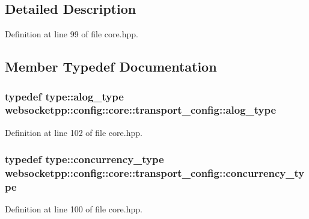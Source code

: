 \subsection{Detailed Description}


Definition at line 99 of file core.\+hpp.



\subsection{Member Typedef Documentation}
\hypertarget{structwebsocketpp_1_1config_1_1core_1_1transport__config_aba152072bfdf296a067d5f860401824d}{}
\subsubsection[{alog\+\_\+type}]{\setlength{\rightskip}{0pt plus 5cm}typedef {\bf type\+::alog\+\_\+type} {\bf websocketpp\+::config\+::core\+::transport\+\_\+config\+::alog\+\_\+type}}\label{structwebsocketpp_1_1config_1_1core_1_1transport__config_aba152072bfdf296a067d5f860401824d}


Definition at line 102 of file core.\+hpp.

\hypertarget{structwebsocketpp_1_1config_1_1core_1_1transport__config_a373a58261c0eaf203726b6a62436362a}{}
\subsubsection[{concurrency\+\_\+type}]{\setlength{\rightskip}{0pt plus 5cm}typedef {\bf type\+::concurrency\+\_\+type} {\bf websocketpp\+::config\+::core\+::transport\+\_\+config\+::concurrency\+\_\+type}}\label{structwebsocketpp_1_1config_1_1core_1_1transport__config_a373a58261c0eaf203726b6a62436362a}


Definition at line 100 of file core.\+hpp.

\hypertarget{structwebsocketpp_1_1config_1_1core_1_1transport__config_ae7514c1c62b41184ec7133de469ab3ae}{}
